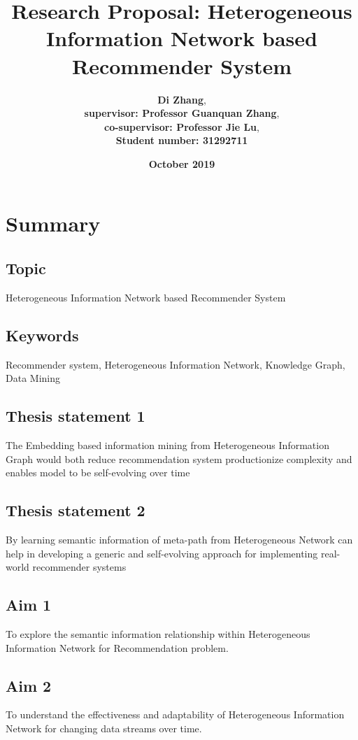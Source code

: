 \documentclass[12pt,a4 paper,title page]{article}
\title{Research Proposal: Heterogeneous Information Network based Recommender System}
\author{\large\textbf{Di Zhang}, \\
\textbf{supervisor: Professor Guanquan Zhang}, \\
\textbf{co-supervisor: Professor Jie Lu}, \\
\textbf{Student number: 31292711}}
\date{\Large{\textbf{October 2019}}}
\begin{document}
\sloppy
\maketitle
\hfill
\hfill

\section*{Summary}

\subsection*{Topic} Heterogeneous Information Network based Recommender System

\subsection*{Keywords} 

Recommender system, Heterogeneous Information Network, Knowledge Graph, Data Mining 

\subsection*{Thesis statement 1}
The Embedding based information mining from Heterogeneous Information Graph would both reduce recommendation system productionize complexity and enables model to be self-evolving over time

\subsection*{Thesis statement 2}
By learning semantic information of meta-path from Heterogeneous Network can help in developing a generic and self-evolving approach for implementing real-world recommender systems  

\subsection*{Aim 1}
To explore the semantic information relationship within Heterogeneous Information Network for Recommendation problem.

\subsection*{Aim 2}
To understand the effectiveness and adaptability of Heterogeneous Information Network for changing data streams over time. 
\end{document}

